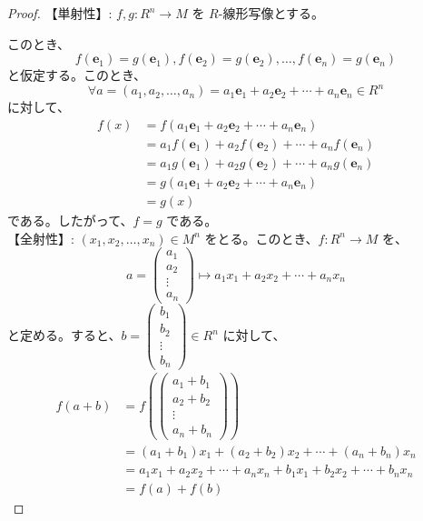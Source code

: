 \documentclass[article,paper=a4paper]{jlreq}
\begin{document}
\begin{proof}
  【単射性】: $f, g \colon R^n \to M$ を $R$-\hspace{0pt}線形写像とする。

  このとき、
  \[f(\mathbf{e}_1) = g(\mathbf{e}_1), f(\mathbf{e}_2) = g(\mathbf{e}_2), \ldots, f(\mathbf{e}_n) = g(\mathbf{e}_n)\]
  と仮定する。このとき、
  \[\forall a = (a_1, a_2, \ldots, a_n) = a_1\mathbf{e}_1 + a_2\mathbf{e}_2 + \cdots + a_n\mathbf{e}_n \in R^n \]
  に対して、
  \begin{align*}
    f(x) &= f(a_1\mathbf{e}_1 + a_2\mathbf{e}_2 + \cdots + a_n\mathbf{e}_n) \\
    &= a_1 f(\mathbf{e}_1) + a_2 f(\mathbf{e}_2) + \cdots + a_n f(\mathbf{e}_n) \\
    &= a_1 g(\mathbf{e}_1) + a_2 g(\mathbf{e}_2) + \cdots + a_n g(\mathbf{e}_n) \\
    &= g(a_1\mathbf{e}_1 + a_2\mathbf{e}_2 + \cdots + a_n\mathbf{e}_n) \\
    &= g(x)
  \end{align*}
  である。したがって、$f = g$ である。\\
  【全射性】: $(x_1, x_2, \ldots, x_n) \in M^n$ をとる。このとき、$f \colon R^n \to M$ を、
  \[a = \begin{pmatrix}
a_1 \\ a_2 \\ \vdots \\ a_n
  \end{pmatrix}  \mapsto a_1x_1 + a_2x_2 + \cdots + a_nx_n\]
  と定める。すると、$b = \begin{pmatrix}
    b_1 \\ b_2 \\ \vdots \\ b_n
      \end{pmatrix} \in R^n$ に対して、
      \begin{align*}
        f(a+b) &= f\left(\begin{pmatrix}a_1 + b_1 \\ a_2 + b_2 \\ \vdots \\ a_n + b_n\end{pmatrix}\right) \\
        &= (a_1 + b_1)x_1 + (a_2 + b_2)x_2 + \cdots + (a_n + b_n)x_n \\
        &= a_1x_1 + a_2x_2 + \cdots + a_nx_n + b_1x_1 + b_2x_2 + \cdots + b_nx_n \\
        &= f(a) + f(b)
      \end{align*}

\end{proof}
\end{document}
